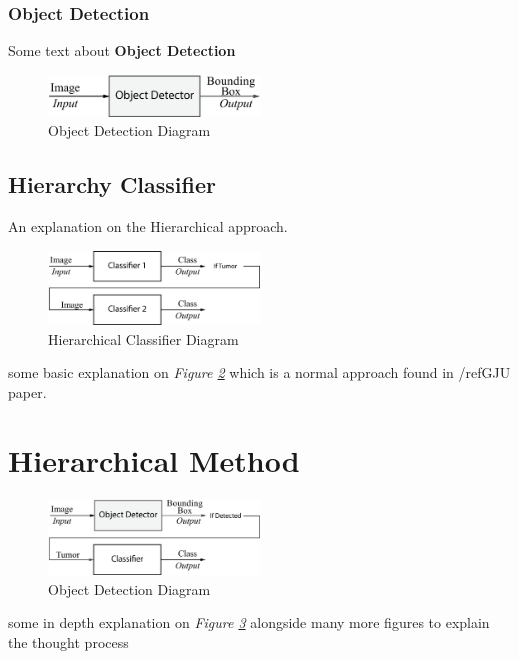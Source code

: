 \documentclass[12pt]{extarticle}
\begin{document}
	\subsubsection{Object Detection}\label{Obj Detection}
	Some text about \textbf{Object Detection}\\
	\begin{figure}[h]
		\centering
		\includegraphics[width=0.5\textwidth]{pics/Figures/Obj_Det_Block_Diagram.eps}
		\caption{\small{Object Detection Diagram}}
		\label{fig:Obj Detector}
	\end{figure}
	
	\subsection{Hierarchy Classifier}
	An explanation on the Hierarchical approach.
	\begin{figure}[h]
		\centering
		\includegraphics[width=0.5\textwidth]{pics/Figures/Hierarchical_Classifier_Block_Diagram.eps}
		\caption{\small{Hierarchical Classifier Diagram}}
		\label{fig:Hierarchical Classifier}
	\end{figure}
	some basic explanation on \emph{Figure \ref{fig:Hierarchical Classifier}} which is a normal approach found in /ref{GJU paper}.
	\newpage
	
	
	\section{Hierarchical Method}\label{Meth}
	
	\begin{figure}[h]
		\centering
		\includegraphics[width=0.5\textwidth]{pics/Figures/Hierarchical_Obj_Det_Block_Diagram.eps}
		\caption{\small{Object Detection Diagram}}
		\label{fig:Hierarchical Obj Detector}
	\end{figure}
	some in depth explanation on \emph{Figure \ref{fig:Hierarchical Obj Detector}} alongside many more figures to explain the thought process 
\end{document}
